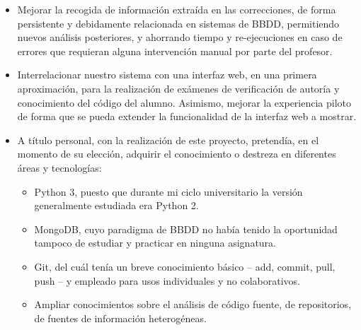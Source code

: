 \begin{itemize}
\item Mejorar la recogida de información extraída en las correcciones, de forma persistente y debidamente relacionada en sistemas de BBDD, permitiendo nuevos análisis posteriores, y ahorrando tiempo y re-ejecuciones en caso de errores que requieran alguna intervención manual por parte del profesor.\\

\item Interrelacionar nuestro sistema con una interfaz web, en una primera aproximación, para la realización de exámenes de verificación de autoría y conocimiento del código del alumno. Asimismo, mejorar la experiencia piloto de forma que se pueda extender la funcionalidad de la interfaz web a mostrar.\\

\item A título personal, con la realización de este proyecto, pretendía, en el momento de su elección, adquirir el conocimiento o destreza en diferentes áreas y tecnologías:\\

\begin{itemize}
\item Python 3, puesto que durante mi ciclo universitario la versión generalmente estudiada era Python 2.\\

\item MongoDB, cuyo paradigma de BBDD no había tenido la oportunidad tampoco de estudiar y practicar en ninguna asignatura.\\

\item Git, del cuál tenía un breve conocimiento básico – add, commit, pull, push – y empleado para usos individuales y no colaborativos.\\

\item Ampliar conocimientos sobre el análisis de código fuente, de repositorios, de fuentes de información heterogéneas.
\end{itemize}
\end{itemize}




